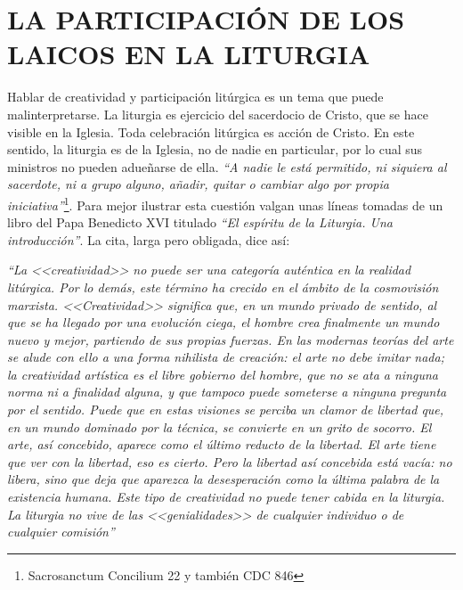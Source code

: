 \documentclass[letterpaper, 12pt]{book}
\begin{document}
    \chapter{LA PARTICIPACI\'ON DE LOS LAICOS EN LA LITURGIA}
    Hablar de creatividad y participaci\'on lit\'urgica es un tema que puede malinterpretarse. La liturgia es ejercicio del sacerdocio de Cristo, que se hace visible en la Iglesia. Toda celebraci\'on lit\'urgica es acci\'on de Cristo. En este sentido, la liturgia es de la Iglesia, no de nadie en particular, por lo cual sus ministros no pueden adue\~narse de ella. \textit{``A nadie le est\'a permitido, ni siquiera al sacerdote, ni a grupo alguno, a\~nadir, quitar o cambiar algo por propia iniciativa''}\footnote{Sacrosanctum Concilium 22 y tambi\'en CDC 846}. Para mejor ilustrar esta cuesti\'on valgan unas l\'ineas tomadas de un libro del Papa Benedicto XVI titulado \textit{``El espíritu de la Liturgia. Una introducción''}. La cita, larga pero obligada, dice as\'i:\newline
    
    \textit{``La <<creatividad>> no puede ser una categor\'ia aut\'entica en la realidad lit\'urgica. Por lo dem\'as, este t\'ermino ha crecido en el \'ambito de la cosmovisi\'on marxista. <<Creatividad>> significa que, en un mundo privado de sentido, al que se ha llegado por una evoluci\'on ciega, el hombre crea finalmente un mundo nuevo y mejor, partiendo de sus propias fuerzas. En las modernas teor\'ias del arte se alude con ello a una forma nihilista de creaci\'on: el arte no debe imitar nada; la creatividad art\'istica es el libre gobierno del hombre, que no se ata a ninguna norma ni a finalidad alguna, y que tampoco puede someterse a ninguna pregunta por el sentido. Puede que en estas visiones se perciba un clamor de libertad que, en un mundo dominado por la t\'ecnica, se convierte en un grito de socorro. El arte, as\'i concebido, aparece como el \'ultimo reducto de la libertad. El arte tiene que ver con la libertad, eso es cierto. Pero la libertad as\'i concebida est\'a vac\'ia: no libera, sino que deja que aparezca la desesperaci\'on como la \'ultima palabra de la existencia humana. Este tipo de creatividad no puede tener cabida en la liturgia. La liturgia no vive de las <<genialidades>> de cualquier individuo o de cualquier comisi\'on''}\newline
    
\end{document}
